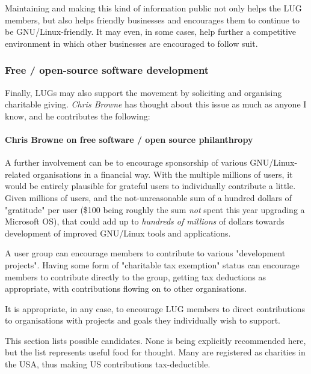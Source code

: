 \documentclass{HOWTO}
\begin{document}
Maintaining and making this kind of information public not only helps
the LUG members, but also helps friendly businesses and encourages
them to continue to be GNU/Linux-friendly. It may even, in some cases, help
further a competitive environment in which other businesses are
encouraged to follow suit.




\subsubsection{Free / open-source software development}

Finally, LUGs may also support the movement by soliciting and
organising charitable giving. 
\emph{Chris Browne} \texttt{\adgurl}
 has thought about this issue as much as
anyone I know, and he contributes the following:




\paragraph{Chris Browne on free software / open source philanthropy}

 
A further involvement can be to encourage sponsorship of various
GNU/Linux-related organisations in a financial way.  With the 
multiple millions of users, it would be entirely plausible for grateful 
users to individually contribute a little. Given millions of users, and 
the not-unreasonable sum of a hundred dollars of "gratitude" per user (\$100 being
roughly the sum {\itshape not\/} spent this year upgrading a Microsoft OS),
that could add up to {\itshape hundreds of millions\/} of dollars towards
development of improved GNU/Linux tools and applications.



 
A user group can encourage members to contribute to various
"development projects". Having some form of "charitable tax exemption"
status can encourage members to contribute directly to the group,
getting tax deductions as appropriate, with contributions flowing on to
other organisations.



 
It is appropriate, in any case, to encourage LUG members to direct
contributions to organisations with projects and goals they
individually wish to support.



 
This section lists possible candidates. None is being explicitly 
recommended here, but the list represents useful food for
thought.  Many are registered as charities in the USA, thus
making US contributions tax-deductible.
\end{document}
